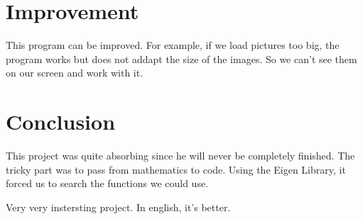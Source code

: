 \documentclass{report}
\begin{document}
\section{Improvement}
This program can be improved. For example, if we load pictures too big, the program works but does not addapt the size of the images. So we can't see them on our screen and work with it. 

\newpage
\section{Conclusion}
This project was quite absorbing since he will never be completely finished. The tricky part was to pass from mathematics to code. Using the Eigen Library, it forced us to search the functions we could use. 

Very very instersting project. In english, it's better. 
\end{document}
